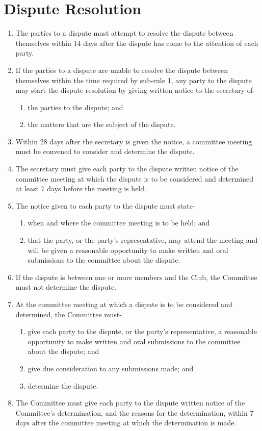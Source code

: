\documentclass[11pt]{article} %
\begin{document}
\section{Dispute Resolution}
\begin{enumerate}
    \item The parties to a dispute must attempt to resolve the dispute between themselves within 14 days after the dispute has come to the attention of each party.
    \item If the parties to a dispute are unable to resolve the dispute between themselves within the time required by sub-rule 1, any party to the dispute may start the dispute resolution by giving written notice to the secretary of-
    \begin{enumerate}
        \item the parties to the dispute; and
        \item the matters that are the subject of the dispute.
    \end{enumerate}
    \item Within 28 days after the secretary is given the notice, a committee meeting must be convened to consider and determine the dispute.
    \item The secretary must give each party to the dispute written notice of the committee meeting at which the dispute is to be considered and determined at least 7 days before the meeting is held.
    \item The notice given to each party to the dispute must state-
    \begin{enumerate}
        \item when and where the committee meeting is to be held; and
        \item that the party, or the party's representative, may attend the meeting and will be given a reasonable opportunity to make written and oral submissions to the committee about the dispute.
    \end{enumerate}
    \item If the dispute is between one or more members and the Club, the Committee must not determine the dispute.
    \item At the committee meeting at which a dispute is to be considered and determined, the Committee must-
    \begin{enumerate}
        \item give each party to the dispute, or the party's representative, a reasonable opportunity to make written and oral submissions to the committee about the dispute; and
        \item give due consideration to any submissions made; and
        \item determine the dispute.
    \end{enumerate}
    \item The Committee must give each party to the dispute written notice of the Committee's determination, and the reasons for the determination, within 7 days after the committee meeting at which the determination is made.
\end{enumerate}
\end{document}
